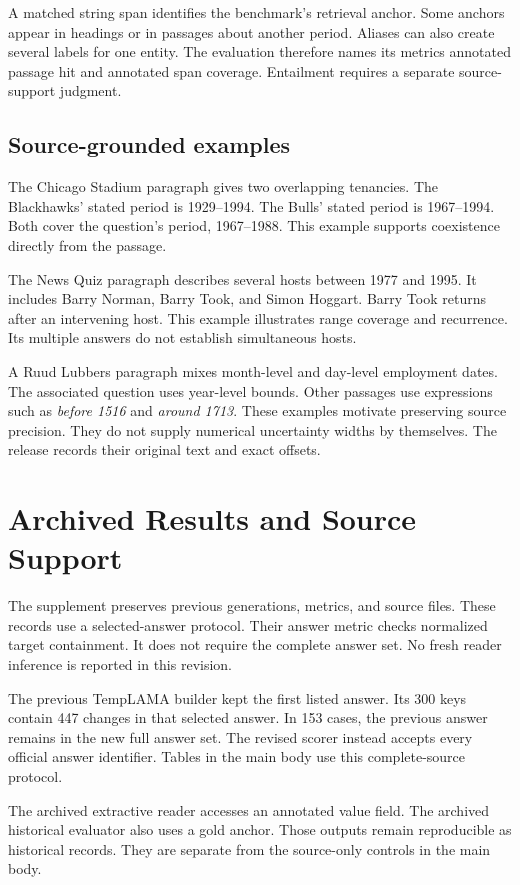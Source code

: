 A matched string span identifies the benchmark's retrieval anchor.
Some anchors appear in headings or in passages about another period.
Aliases can also create several labels for one entity.
The evaluation therefore names its metrics annotated passage hit and annotated span coverage.
Entailment requires a separate source-support judgment.

\subsection{Source-grounded examples}
The Chicago Stadium paragraph gives two overlapping tenancies.
The Blackhawks' stated period is 1929--1994.
The Bulls' stated period is 1967--1994.
Both cover the question's period, 1967--1988.
This example supports coexistence directly from the passage.

The News Quiz paragraph describes several hosts between 1977 and 1995.
It includes Barry Norman, Barry Took, and Simon Hoggart.
Barry Took returns after an intervening host.
This example illustrates range coverage and recurrence.
Its multiple answers do not establish simultaneous hosts.

A Ruud Lubbers paragraph mixes month-level and day-level employment dates.
The associated question uses year-level bounds.
Other passages use expressions such as \emph{before 1516} and \emph{around 1713}.
These examples motivate preserving source precision.
They do not supply numerical uncertainty widths by themselves.
The release records their original text and exact offsets.

\section{Archived Results and Source Support}
\label{app:archive}
The supplement preserves previous generations, metrics, and source files.
These records use a selected-answer protocol.
Their answer metric checks normalized target containment.
It does not require the complete answer set.
No fresh reader inference is reported in this revision.

The previous TempLAMA builder kept the first listed answer.
Its 300 keys contain 447 changes in that selected answer.
In 153 cases, the previous answer remains in the new full answer set.
The revised scorer instead accepts every official answer identifier.
Tables in the main body use this complete-source protocol.

The archived extractive reader accesses an annotated value field.
The archived historical evaluator also uses a gold anchor.
Those outputs remain reproducible as historical records.
They are separate from the source-only controls in the main body.

